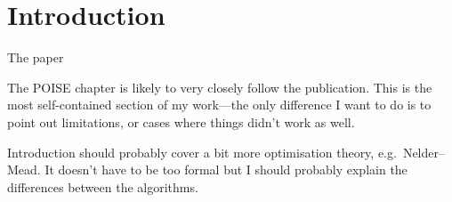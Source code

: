 \section{Introduction}
\label{sec:poise__introduction}

The paper\autocite{Yong2021AC}

The POISE chapter is likely to very closely follow the publication.
This is the most self-contained section of my work---the only difference I want to do is to point out limitations, or cases where things didn't work as well.

Introduction should probably cover a bit more optimisation theory, e.g.\ Nelder--Mead. It doesn't have to be too formal but I should probably explain the differences between the algorithms.
